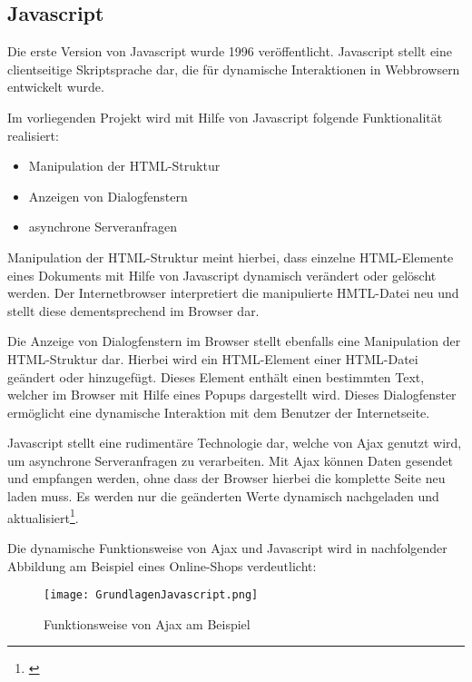 \subsection{Javascript}
\label{sec:Javascript}

Die erste Version von Javascript wurde 1996 veröffentlicht. Javascript stellt
eine clientseitige Skriptsprache dar, die für dynamische Interaktionen in
Webbrowsern entwickelt wurde.

Im vorliegenden Projekt wird mit Hilfe von Javascript folgende Funktionalität
realisiert:

\begin{itemize}
  \item Manipulation der HTML-Struktur
  \item Anzeigen von Dialogfenstern
  \item asynchrone Serveranfragen
\end{itemize}

Manipulation der HTML-Struktur meint hierbei, dass einzelne HTML-Elemente eines
Dokuments mit Hilfe von Javascript dynamisch verändert oder gelöscht werden.
Der Internetbrowser interpretiert die manipulierte HMTL-Datei neu und stellt
diese dementsprechend im Browser dar.

Die Anzeige von Dialogfenstern im Browser stellt ebenfalls eine Manipulation
der HTML-Struktur dar. Hierbei wird ein HTML-Element einer HTML-Datei geändert
oder hinzugefügt. Dieses Element enthält einen bestimmten Text, welcher im
Browser mit Hilfe eines Popups dargestellt wird. Dieses Dialogfenster ermöglicht
eine dynamische Interaktion mit dem Benutzer der Internetseite.

Javascript stellt eine rudimentäre Technologie dar, welche von Ajax genutzt
wird, um asynchrone Serveranfragen zu verarbeiten. Mit Ajax können Daten
gesendet und empfangen werden, ohne dass der Browser hierbei die komplette Seite
neu laden muss. Es werden nur die geänderten Werte dynamisch nachgeladen und
aktualisiert\footnote{\citet[S.~104]{heinle2006}}.

Die dynamische Funktionsweise von Ajax und Javascript wird in nachfolgender
Abbildung am Beispiel eines Online-Shops verdeutlicht:

\begin{figure}[htb]
\centering
\texttt{[image: GrundlagenJavascript.png]}
\caption[Grundlagen Javascript]{Funktionsweise von Ajax am Beispiel\protect\footnotemark}
\label{fig:GrundlagendJavascript}
\end{figure}
